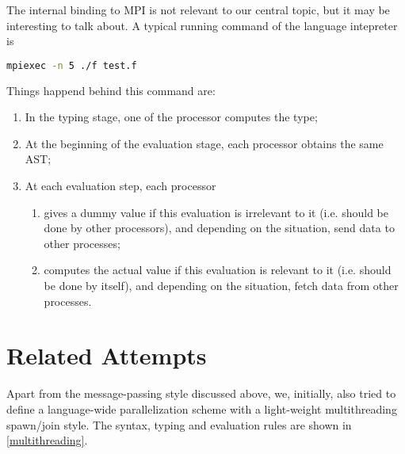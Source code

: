\documentclass{report}
\begin{document}
The internal binding to MPI is not relevant to our central topic, but it may be interesting to talk about. A typical running command of the language intepreter is

\begin{lstlisting}[language=bash,caption={Running Command Showcase}]
mpiexec -n 5 ./f test.f
\end{lstlisting}

Things happend behind this command are:

\begin{enumerate}
  \item In the typing stage, one of the processor computes the type;
  \item At the beginning of the evaluation stage, each processor obtains the same AST;
  \item At each evaluation step, each processor
  \begin{enumerate}
    \item gives a dummy value if this evaluation is irrelevant to it (i.e. should be done by other processors), and depending on the situation, send data to other processes;
    \item computes the actual value if this evaluation is relevant to it (i.e. should be done by itself), and depending on the situation, fetch data from other processes.
  \end{enumerate}
\end{enumerate}

\section{Related Attempts}

Apart from the message-passing style discussed above, we, initially, also tried to define a language-wide parallelization scheme with a light-weight multithreading spawn/join style. The syntax, typing and evaluation rules are shown in \ref{multithreading}.
\end{document}
